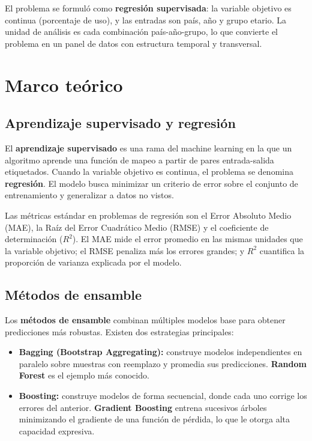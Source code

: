 \documentclass[12pt,a4paper]{article}
\begin{document}
El problema se formul\'o como \textbf{regresi\'on supervisada}: la variable objetivo es continua (porcentaje de uso), y las entradas son pa\'is, a\~no y grupo etario. La unidad de an\'alisis es cada combinaci\'on pa\'is-a\~no-grupo, lo que convierte el problema en un panel de datos con estructura temporal y transversal.

\section{Marco te\'orico}

\subsection{Aprendizaje supervisado y regresi\'on}

El \textbf{aprendizaje supervisado} es una rama del machine learning en la que un algoritmo aprende una funci\'on de mapeo a partir de pares entrada-salida etiquetados. Cuando la variable objetivo es continua, el problema se denomina \textbf{regresi\'on}. El modelo busca minimizar un criterio de error sobre el conjunto de entrenamiento y generalizar a datos no vistos.

Las m\'etricas est\'andar en problemas de regresi\'on son el Error Absoluto Medio (MAE), la Ra\'iz del Error Cuadr\'atico Medio (RMSE) y el coeficiente de determinaci\'on ($R^2$). El MAE mide el error promedio en las mismas unidades que la variable objetivo; el RMSE penaliza m\'as los errores grandes; y $R^2$ cuantifica la proporci\'on de varianza explicada por el modelo.

\subsection{M\'etodos de ensamble}

Los \textbf{m\'etodos de ensamble} combinan m\'ultiples modelos base para obtener predicciones m\'as robustas. Existen dos estrategias principales:

\begin{itemize}
    \item \textbf{Bagging (Bootstrap Aggregating):} construye modelos independientes en paralelo sobre muestras con reemplazo y promedia sus predicciones. \textbf{Random Forest} es el ejemplo m\'as conocido.
    \item \textbf{Boosting:} construye modelos de forma secuencial, donde cada uno corrige los errores del anterior. \textbf{Gradient Boosting} entrena sucesivos \'arboles minimizando el gradiente de una funci\'on de p\'erdida, lo que le otorga alta capacidad expresiva.
\end{itemize}
\end{document}
